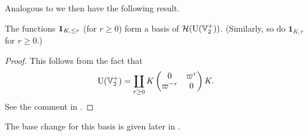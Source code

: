 Analogous to  we then have the following result.
\begin{proposition}[$\fr$ basis]
  The functions $\fr$ (for $r \ge 0$) form a basis of $\mathcal H(\operatorname{U}(\mathbb V_2^+))$.
  (Similarly, so do $\mathbf{1}_{K, r}$ for $r \ge 0$.)
\end{proposition}
\begin{proof}
  This follows from the fact that
  \[ \operatorname{U}(\mathbb V_2^+) = \coprod_{r \ge 0}
    K \begin{pmatrix} 0 & \varpi^r \\ \varpi^{-r} & 0 \end{pmatrix} K. \]
  See the comment in \cite[Equation (7.1.5)]{ref:AFLspherical}.
\end{proof}

The base change for this basis is given later in .

